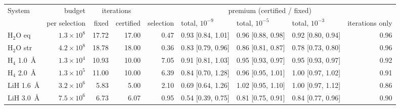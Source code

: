 \begin{tabular}{@{}lrrrrlllr@{}}
\toprule
System & budget & \multicolumn{2}{c}{iterations} & \multicolumn{5}{c}{premium (certified / fixed)} \\
\cmidrule(lr){3-4}\cmidrule(lr){5-9}
 & per selection & fixed & certified & selection & total, $10^{-9}$ & total, $10^{-5}$ & total, $10^{-3}$ & iterations only \\
\midrule
H$_2$O eq & $1.3\times10^{8}$ & 17.72 & 17.00 & 0.47 & 0.93 [0.84, 1.01] & 0.96 [0.88, 0.98] & 0.92 [0.80, 0.94] & 0.96 \\
H$_2$O str & $4.2\times10^{8}$ & 18.78 & 18.00 & 0.36 & 0.83 [0.79, 0.96] & 0.86 [0.81, 0.87] & 0.78 [0.73, 0.80] & 0.96 \\
H$_4$ 1.0~\AA & $1.3\times10^{4}$ & 10.93 & 10.00 & 7.05 & 0.91 [0.81, 1.03] & 0.95 [0.93, 0.97] & 0.95 [0.93, 0.97] & 0.92 \\
H$_4$ 2.0~\AA & $1.3\times10^{5}$ & 11.00 & 10.00 & 6.39 & 0.84 [0.70, 1.28] & 0.96 [0.95, 1.01] & 1.00 [0.97, 1.02] & 0.91 \\
LiH 1.6~\AA & $3.2\times10^{6}$ & 5.83 & 5.00 & 2.10 & 0.69 [0.64, 1.26] & 1.02 [0.95, 1.10] & 1.00 [0.97, 1.12] & 0.86 \\
LiH 3.0~\AA & $7.5\times10^{6}$ & 6.73 & 6.07 & 0.95 & 0.54 [0.39, 0.75] & 0.81 [0.75, 0.91] & 0.84 [0.77, 0.96] & 0.90 \\
\bottomrule
\end{tabular}
